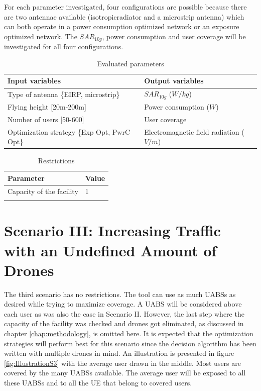For each parameter investigated, four configurations are possible because there are two antennae available (\gls{isotropicradiator} and a microstrip antenna) which can both operate in a power consumption optimized network or an exposure optimized 
network. The $SAR_{10g}$, power consumption and user coverage will be investigated for all four configurations.

\begin{table}[h]
\centering
            \begin{tabular}{|m{8cm}|m{7cm}|}
            \hline
            \textbf{Input variables  }              & \textbf{Output variables}          \\   \hline 
            Type of antenna  \{EIRP, microstrip\}               & $SAR_{10g}$ ($W/kg$)             \\ 
            Flying height [20m-200m]                 & Power consumption ($W$)          \\ 
            Number of users  [50-600]              & User coverage            \\
            Optimization strategy \{Exp Opt, PwrC Opt\}        &     Electromagnetic field radiation ($V/m$)\\
            \hline
            \end{tabular}
            \caption{Evaluated parameters}
          \label{table:s2:evalpara}
\end{table}
\begin{table}[h]
\centering
        \begin{tabular}{|m{8cm}|m{7cm}|}
        \hline
        \textbf{Parameter}            & \textbf{Value}       \\   \hline 
        Capacity of the facility          & 1        \\    
        & \\ 
        \hline
        \end{tabular}
        \caption{Restrictions}
        \label{table:S2:restrictions}
\end{table}




\section{Scenario III: Increasing Traffic with an Undefined Amount of Drones}


The third scenario has no restrictions. The tool can use as much \gls{UABS}s as desired while trying to maximize coverage. 
A \gls{UABS} will be considered above each user as was also the case in Scenario II. However, the last step where the capacity of the facility
was checked and drones got eliminated, as discussed in chapter \ref{chap:methodology}, is omitted here. It is expected that the optimization strategies will perform best for this scenario since the decision algorithm has been written
 with multiple drones in mind. 
An illustration is presented in figure \ref{fig:IllustrationS3} with the average user drawn in the middle.
Most users are covered by the many \gls{UABS}s available. The average user 
will be exposed to all these \gls{UABS}s and to all the \gls{UE} that belong to covered users.

